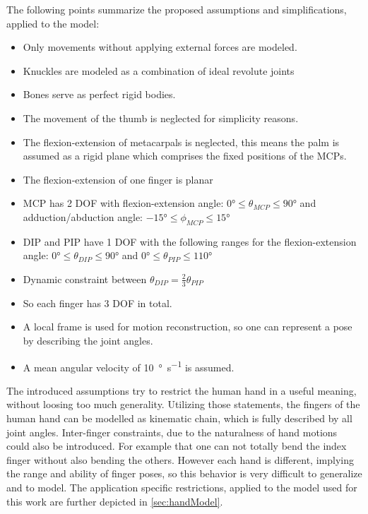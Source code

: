 The following points summarize the proposed assumptions and simplifications, applied to the model:
\begin{itemize}
\item Only movements without applying external forces are modeled.
\item Knuckles are modeled as a combination of ideal revolute joints
\item Bones serve as perfect rigid bodies.
\item The movement of the thumb is neglected for simplicity reasons.
\item The flexion-extension of metacarpals is neglected, this means the palm is assumed as a rigid plane which comprises the fixed positions of the \acp{MCP}.
\item The flexion-extension of one finger is planar
\item \ac{MCP} has 2 \ac{DOF} with flexion-extension angle: $ \ang{0} \leq \theta_{MCP} \leq \ang{90} $ and adduction/abduction angle: $ \ang{-15} \leq \phi_{MCP} \leq \ang{+15} $
\item \ac{DIP} and \ac{PIP} have 1 DOF with the following ranges for the flexion-extension angle: $ \ang{0} \leq \theta_{DIP} \leq \ang{90} $ and $ \ang{0} \leq \theta_{PIP} \leq \ang{110} $
\item Dynamic constraint between $ \theta_{DIP} = \frac{2}{3} \theta_{PIP} $
\item So each finger has 3 \ac{DOF} in total.
\item A local frame is used for motion reconstruction, so one can represent a pose by describing the joint angles.
\item A mean angular velocity of \SI[per-mode=symbol]{10}{\degree \per \second} is assumed.
\end{itemize}

The introduced assumptions try to restrict the human hand in a useful meaning, without loosing too much generality. Utilizing those statements, the fingers of the human hand can be modelled as kinematic chain, which is fully described by all joint angles. Inter-finger constraints, due to the naturalness of hand motions could also be introduced. For example that one can not totally bend the index finger without also bending the others. However each hand is different, implying the range and ability of finger poses, so this behavior is very difficult to generalize and to model. The application specific restrictions, applied to the model used for this work are further depicted in \ref{sec:handModel}.



